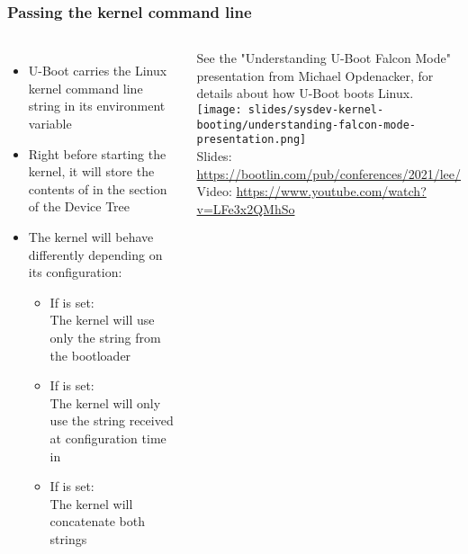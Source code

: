 \begin{frame}
  \frametitle{Passing the kernel command line}
  \begin{columns}
    \begin{itemize}
    \item U-Boot carries the Linux kernel command line string in its
       environment variable
    \item Right before starting the kernel, it will store the contents of
       in the  section of the Device Tree
    \item The kernel will behave differently depending on its
      configuration:
      \begin{itemize}
      \item If  is set:\\
        The kernel will use only the string from the bootloader
      \item If  is set:\\
        The kernel will only use the string received at configuration
        time in 
      \item If  is set:\\
        The kernel will concatenate both strings
      \end{itemize}
    \end{itemize}
    \tiny See the "Understanding U-Boot Falcon Mode"
    presentation from Michael Opdenacker, for details about how U-Boot
    boots Linux.\\
    \vspace{0.6cm}
    \texttt{[image: slides/sysdev-kernel-booting/understanding-falcon-mode-presentation.png]}\\
    \vspace{0.4cm}
    \tiny Slides: \url{https://bootlin.com/pub/conferences/2021/lee/}\\
    Video: \url{https://www.youtube.com/watch?v=LFe3x2QMhSo}
  \end{columns}
\end{frame}

